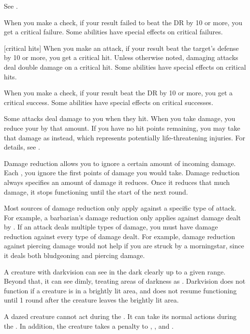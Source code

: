  See .

 When you make a check, if your result failed to beat the DR by 10 or more, you get a critical failure.
Some abilities have special effects on critical failures.

[critical hits] When you make an attack, if your result beat the target's defense by 10 or more, you get a critical hit.
Unless otherwise noted, damaging attacks deal double damage on a critical hit.
Some abilities have special effects on critical hits.

 When you make a check, if your result beat the DR by 10 or more, you get a critical success.
Some abilities have special effects on critical successes.

 Some attacks deal damage to you when they hit.
When you take damage, you reduce your  by that amount.
If you have no hit points remaining, you may take that damage as  instead, which represents potentially life-threatening injuries.
For details, see .

 Damage reduction allows you to ignore a certain amount of incoming damage.
Each , you ignore the first points of damage you would take.
Damage reduction always specifies an amount of damage it reduces.
Once it reduces that much damage, it stops functioning until the start of the next round.

Most sources of damage reduction only apply against a specific type of attack.
For example, a barbarian's damage reduction only applies against damage dealt by .
If an attack deals multiple types of damage, you must have damage reduction against every type of damage dealt.
For example, damage reduction against piercing damage would not help if you are struck by a morningstar, since it deals both bludgeoning and piercing damage.

 A creature with darkvision can see in the dark clearly up to a given range.
Beyond that, it can see dimly, treating areas of darkness as .
Darkvision does not function if a creature is in a brightly lit area, and does not resume functioning until 1 round after the creature leaves the brightly lit area.

 A dazed creature cannot act during the .
It can take its normal actions during the .
In addition, the creature takes a  penalty to , , and .

